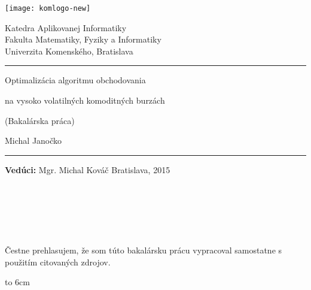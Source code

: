 \documentclass[12pt]{book}
\def\mftitle{Optimalizácia algoritmu obchodovania}
\def\mftitles{na vysoko volatilných komoditných burzách}
\def\mfthesistype{Bakalárska práca}
\def\mfauthor{Michal Janočko}
\def\mfadvisor{Mgr. Michal Kováč}
\def\mfplacedate{Bratislava, 2015}
\begin{document}
\frontmatter

\thispagestyle{empty}

\noindent
\begin{minipage}{0.20\textwidth}
\texttt{[image: komlogo-new]}
\end{minipage}
\begin{minipage}{0.79\textwidth}
\begin{center}
\sc Katedra Aplikovanej Informatiky \\
Fakulta Matematiky, Fyziky a Informatiky \\
Univerzita Komenského, Bratislava
\end{center}
\end{minipage}

\vfill
\begin{center}
\begin{minipage}{0.8\textwidth}
\hrule
\bigskip\bigskip
\centerline{\LARGE\sc\mftitle}
\centerline{\LARGE\sc\mftitles}
\smallskip
\centerline{(\mfthesistype)}
\bigskip
\bigskip
\centerline{\large\sc\mfauthor}
\bigskip\bigskip
\hrule
\end{minipage}
\end{center}
\vfill
{\bf Vedúci:} \mfadvisor
\hfill\mfplacedate
\eject %

\thispagestyle{empty}~\vfill\eject %

{~}\vspace{12cm}

\noindent
\begin{minipage}{0.25\textwidth}~\end{minipage}
\begin{minipage}{0.68\textwidth}
Čestne prehlasujem, že som túto bakalársku prácu vypracoval samostatne s použitím citovaných zdrojov.

\bigskip\bigskip

\hfill\hbox to 6cm{\dotfill}
\end{minipage}
\vfill\eject %
~\vfill\eject %

\tableofcontents

\mainmatter




\backmatter

\nocite{*}


\end{document}
